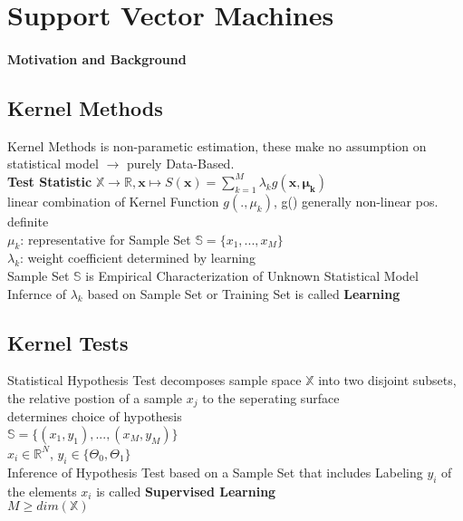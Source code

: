 \section{Support Vector Machines}

	\paragraph{Motivation and Background}
\begin{sectionbox}

	\subsection{Kernel Methods} 
	Kernel Methods is non-parametic estimation, these make no assumption on statistical model $\rightarrow$ purely Data-Based. \\
	\textbf{Test Statistic} 
	$\boxed{\mathbb{X} \rightarrow \mathbb{R}, \mathbf{x}\mapsto S(\mathbf{x})= \sum_{k=1}^{M} \lambda_kg(\mathbf{x}, \mathbf{\mu_k})}$ \\
	linear combination of Kernel Function $g(.,\mu_k)$, g() generally non-linear pos. definite \\ %
	
	$\mu_k$: representative for Sample Set $\mathbb{S}=\{x_1,...,x_M\}$ \\  
	$\lambda_k$: weight coefficient determined by learning \\
	Sample Set $\mathbb{S}$ is Empirical Characterization of Unknown Statistical Model \\
	Infernce of $\lambda_k$ based on Sample Set or Training Set is called \textbf{Learning}

	
\end{sectionbox}

\begin{sectionbox}
	\subsection{Kernel Tests}
Statistical Hypothesis Test decomposes sample space $\mathbb{X}$ into two disjoint subsets, the relative postion of a sample $x_j$ to the seperating surface \\determines choice of hypothesis\\
$\boxed{\mathbb{S} = \{(x_1, y_1),...,(x_M, y_M)\}}$ %
\\
$x_i \in \mathbb{R}^N$, $y_i \in \{\Theta_0, \Theta_1\}$ \\
Inference of Hypothesis Test based on a Sample Set that includes Labeling $y_i$ of the elements $x_i$ is called \textbf{Supervised Learning} \\
$M \geq dim(\mathbb{X})$
\end{sectionbox}


